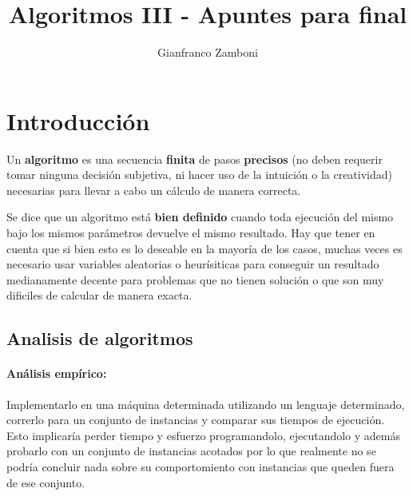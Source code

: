


\title{Algoritmos III - Apuntes para final}
\author{Gianfranco Zamboni}

\usepackage[backend=biber,style=chem-acs,sorting=none]{biblatex}
\nocite{*}




\setcounter{tocdepth}{3}
	
	
	
	\maketitle
	\tableofcontents

\newpage
\section{Introducción}
Un \textbf{algoritmo} es una secuencia \textbf{finita} de pasos  \textbf{precisos} (no deben requerir tomar ninguna decisión subjetiva, ni hacer uso de la intuición o la creatividad) necesarias para llevar a cabo un cálculo de manera correcta.

Se dice que un algoritmo está \textbf{bien definido} cuando toda ejecución del mismo bajo los mismos parámetros devuelve el mismo resultado. Hay que tener en cuenta que si bien esto es lo deseable en la mayoría de los casos, muchas veces es necesario usar variables aleatorias o heurísiticas para conseguir un resultado medianamente decente para problemas que no tienen solución o que son muy dificiles de calcular de manera exacta.

\subsection{Analisis de algoritmos}

\paragraph{Análisis empírico:} Implementarlo en una máquina determinada utilizando un lenguaje determinado, correrlo para un conjunto de instancias y comparar sus tiempos de ejecución. Esto implicaría perder tiempo y esfuerzo programandolo, ejecutandolo y además probarlo con un conjunto de instancias acotados por lo que realmente no se podría concluir nada sobre su comportomiento con instancias que queden fuera de ese conjunto.

